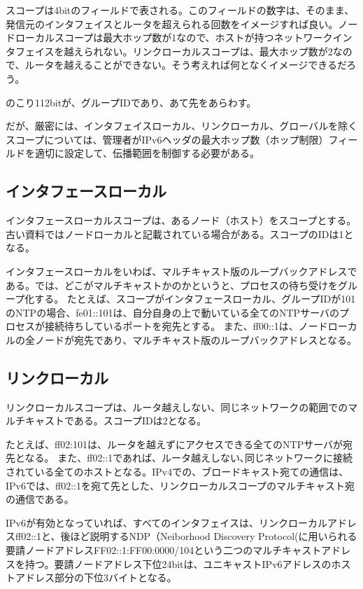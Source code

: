 スコープは4bitのフィールドで表される。このフィールドの数字は、そのまま、発信元のインタフェイスとルータを超えられる回数をイメージすれば良い。ノードローカルスコープは最大ホップ数が1なので、ホストが持つネットワークインタフェイスを越えられない。リンクローカルスコープは、最大ホップ数が2なので、ルータを越えることができない。そう考えれば何となくイメージできるだろう。

のこり112bitが、グループIDであり、あて先をあらわす。

だが、厳密には、インタフェイスローカル、リンクローカル、グローバルを除くスコープについては、管理者がIPv6ヘッダの最大ホップ数（ホップ制限）フィールドを適切に設定して、伝播範囲を制御する必要がある。

\subsection{インタフェースローカル}
インタフェースローカルスコープは、あるノード（ホスト）をスコープとする。古い資料ではノードローカルと記載されている場合がある。スコープのIDは1となる。

インタフェースローカルをいわば、マルチキャスト版のループバックアドレスである。では、どこがマルチキャストかのかというと、プロセスの待ち受けをグループ化する。
たとえば、スコープがインタフェースローカル、グループIDが101のNTPの場合、fe01::101は、自分自身の上で動いている全てのNTPサーバのプロセスが接続待ちしているポートを宛先とする。
また、ff00::1は、ノードローカルの全ノードが宛先であり、マルチキャスト版のループバックアドレスとなる。

\subsection{リンクローカル}
リンクローカルスコープは、ルータ越えしない、同じネットワークの範囲でのマルチキャストである。スコープIDは2となる。

たとえば、ff02:101は、ルータを越えずにアクセスできる全てのNTPサーバが宛先となる。
また、ff02::1であれば、ルータ越えしない､同じネットワークに接続されている全てのホストとなる。IPv4での、ブロードキャスト宛ての通信は、IPv6では、ff02::1を宛て先とした、リンクローカルスコープのマルチキャスト宛の通信である。

IPv6が有効となっていれば、すべてのインタフェイスは、リンクローカルアドレスff02::1と、後ほど説明するNDP（Neiborhood Discovery Protocol(に用いられる要請ノードアドレスFF02::1:FF00:0000/104という二つのマルチキャストアドレスを持つ。要請ノードアドレス下位24bitは、ユニキャストIPv6アドレスのホストアドレス部分の下位3バイトとなる。



